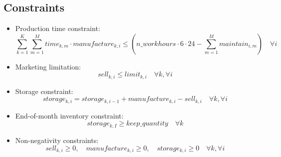 \documentclass{article}
\begin{document}
\subsection*{Constraints}
\begin{itemize}
    \item Production time constraint:
    \[
    \sum_{k=1}^{K} \sum_{m=1}^{M} time_{k,m} \cdot manufacture_{k,i} \leq (n\_workhours \cdot 6 \cdot 24 - \sum_{m=1}^{M} maintain_{i,m}) \quad \forall i
    \]
    
    \item Marketing limitation:
    \[
    sell_{k,i} \leq limit_{k,i} \quad \forall k, \forall i
    \]

    \item Storage constraint:
    \[
    storage_{k,i} = storage_{k,i-1} + manufacture_{k,i} - sell_{k,i} \quad \forall k, \forall i
    \]
    
    \item End-of-month inventory constraint:
    \[
    storage_{k,I} \geq keep\_quantity \quad \forall k
    \]
    
    \item Non-negativity constraints:
    \[
    sell_{k,i} \geq 0, \quad manufacture_{k,i} \geq 0, \quad storage_{k,i} \geq 0 \quad \forall k, \forall i
    \]
\end{itemize}
\end{document}
